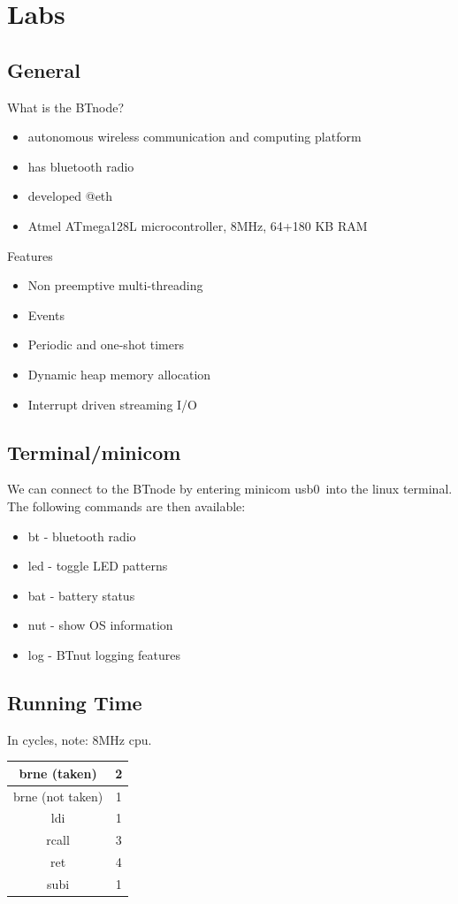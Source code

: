 
\section{Labs}

\subsection{General}
What is the BTnode?
\begin{itemize}[noitemsep]
\item autonomous wireless communication and computing platform
\item has bluetooth radio
\item developed @eth
\item Atmel ATmega128L microcontroller, 8MHz, 64+180 KB RAM
\end{itemize}

Features
\begin{itemize}[noitemsep]
\item Non preemptive multi-threading
\item Events
\item Periodic and one-shot timers
\item Dynamic heap memory allocation
\item Interrupt driven streaming I/O
\end{itemize}


\subsection{Terminal/minicom}
We can connect to the BTnode by entering \grqq minicom usb0\grqq\ into the linux terminal. The following commands are then available:
\begin{itemize}[noitemsep]
\item bt - bluetooth radio
\item led - toggle LED patterns
\item bat - battery status
\item nut - show OS information
\item log - BTnut logging features
\end{itemize}

\subsection{Running Time}
In cycles, note: 8MHz cpu. \\
\begin{tabular}{|c|c|}
\hline brne (taken) & 2 \\ 
\hline brne (not taken) & 1 \\ 
\hline ldi & 1 \\ 
\hline rcall & 3 \\ 
\hline ret & 4 \\ 
\hline subi & 1 \\ 
\hline 
\end{tabular}

